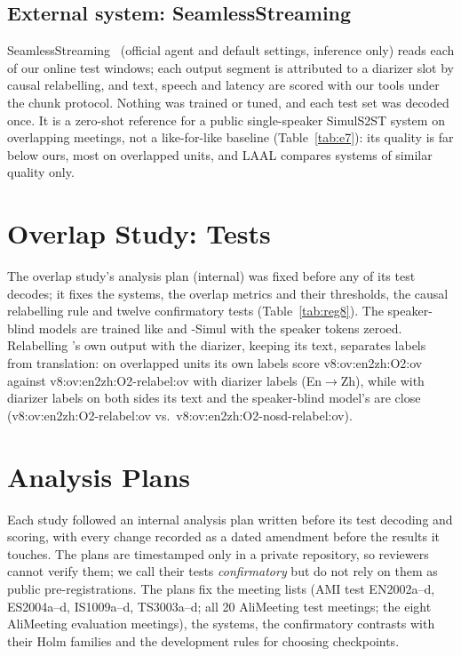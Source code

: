 \subsection{External system: SeamlessStreaming}
\label{app:e7}
SeamlessStreaming~\citep{seamless2023} (official agent and default settings, inference only) reads each of our online
test windows; each output segment is attributed to a diarizer slot by causal relabelling, and text, speech and latency
are scored with our tools under the chunk protocol. Nothing was trained or tuned, and each test set was decoded once.
It is a zero-shot reference for a public single-speaker SimulS2ST system on overlapping meetings, not a like-for-like
baseline (Table~\ref{tab:e7}): its quality is far below ours, most on overlapped units, and LAAL compares systems of
similar quality only.


\section{Overlap Study: Tests}
\label{app:v8}

The overlap study's analysis plan (internal) was fixed before any of its test decodes; it fixes the systems, the overlap
metrics and their thresholds, the causal relabelling rule and twelve confirmatory tests (Table~\ref{tab:reg8}). The
speaker-blind models are trained like \sys{} and \sys{}-Simul with the speaker tokens zeroed. Relabelling \sys{}'s own
output with the diarizer, keeping its text, separates labels from translation: on overlapped units its own labels score
\num{v8:ov:en2zh:O2:ov} against \num{v8:ov:en2zh:O2-relabel:ov} with diarizer labels (En$\rightarrow$Zh), while with
diarizer labels on both sides its text and the speaker-blind model's are close
(\num{v8:ov:en2zh:O2-relabel:ov} vs.\ \num{v8:ov:en2zh:O2-nosd-relabel:ov}).




\section{Analysis Plans}
\label{app:prereg}

Each study followed an internal analysis plan written before its test decoding and scoring, with every change recorded
as a dated amendment before the results it touches. The plans are timestamped only in a private repository, so
reviewers cannot verify them; we call their tests \emph{confirmatory} but do not rely on them as public
pre-registrations. The plans fix the meeting lists (AMI test EN2002a--d, ES2004a--d, IS1009a--d, TS3003a--d; all 20
AliMeeting test meetings; the eight AliMeeting evaluation meetings), the systems, the confirmatory contrasts with their
Holm families and the development rules for choosing checkpoints.
